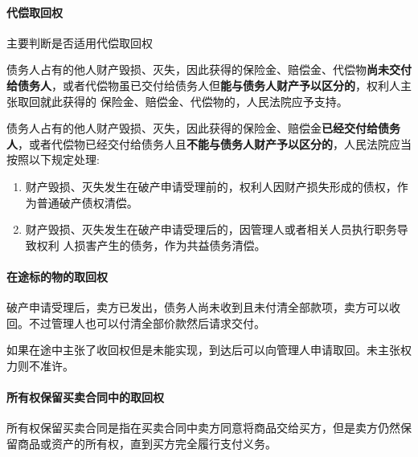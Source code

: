 \documentclass[UTF8,12pt]{ctexart}
\numberwithin{equation}{section} %
\numberwithin{figure}{section}
\numberwithin{table}{section}
\begin{document}
	
	\paragraph{代偿取回权}
	主要判断是否适用代偿取回权
	
	债务人占有的他人财产毁损、灭失，因此获得的保险金、赔偿金、代偿物\textbf{尚未交付给债务人}，或者代偿物虽已交付给债务人但\textbf{能与债务人财产予以区分的}，权利人主张取回就此获得的 保险金、赔偿金、代偿物的，人民法院应予支持。
	
	
	债务人占有的他人财产毁损、灭失，因此获得的保险金、赔偿金\textbf{已经交付给债务人}，或者代偿物已经交付给债务人且\textbf{不能与债务人财产予以区分的}，人民法院应当按照以下规定处理: 
	\begin{enumerate}
		\item 财产毁损、灭失发生在破产申请受理前的，权利人因财产损失形成的债权，作为普通破产债权清偿。
		
		\item 财产毁损、灭失发生在破产申请受理后的，因管理人或者相关人员执行职务导致权利 人损害产生的债务，作为共益债务清偿。
	\end{enumerate}
	
	
	\paragraph{在途标的物的取回权}
	破产申请受理后，卖方已发出，债务人尚未收到且未付清全部款项，卖方可以收回。不过管理人也可以付清全部价款然后请求交付。
	
	如果在途中主张了收回权但是未能实现，到达后可以向管理人申请取回。未主张权力则不准许。
	
	\paragraph{所有权保留买卖合同中的取回权}
	所有权保留买卖合同是指在买卖合同中卖方同意将商品交给买方，但是卖方仍然保留商品或资产的所有权，直到买方完全履行支付义务。
	
\end{document}
